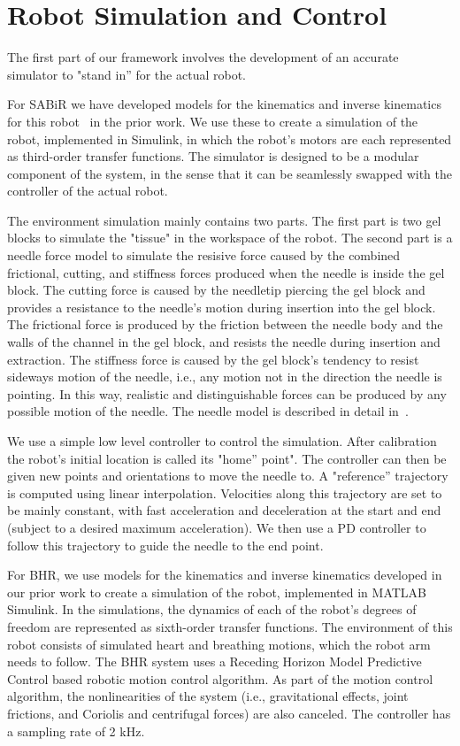 \section{Robot Simulation and Control}\label{robotsimulator}
The first part of our framework involves the development of an accurate simulator to "stand in'' for the actual robot. 

For SABiR we have developed models for the kinematics and inverse kinematics for this robot~\cite{hwang2009kinematic} in the prior work. We use these to create a simulation of the robot, implemented in Simulink, in which the robot’s motors are each represented as third-order transfer functions. The simulator is designed to be a modular component of the system, in the sense that it can be seamlessly swapped with the controller of the actual robot.

The environment simulation mainly contains two parts. The first part is two gel blocks to simulate the "tissue" in the workspace of the robot.  The second part is a needle force model to simulate the resisive force caused by the combined frictional, cutting, and stiffness forces produced when the needle is inside the gel block. The cutting force is caused by the needletip piercing the gel block and provides a resistance to the needle’s motion during insertion into the gel block.  The frictional force is produced by the friction between the needle body and the walls of the channel in the gel block, and resists the needle during insertion and extraction. The stiffness force is caused by the gel block’s tendency to resist sideways motion of the needle, i.e., any motion not in the direction the needle is pointing. In this way, realistic and distinguishable forces can be produced by any possible motion of the needle. The needle model is described in detail in~\cite{Russell2012}.

We use a simple low level controller to control the simulation. After calibration the robot’s initial location is called its "home'' point". The controller can then be given new points and orientations to move the needle to. A "reference'' trajectory is computed using linear interpolation. Velocities along this trajectory are set to be mainly constant, with fast acceleration and deceleration at the start and end (subject to a desired maximum acceleration). We then use a PD controller to follow this trajectory to guide the needle to the end point.

For BHR, we use models for the kinematics and inverse kinematics developed in our prior work \cite{bebek2007whisker} to create a simulation of the robot, implemented in MATLAB Simulink. In the simulations, the dynamics of each of the robot’s degrees of freedom are represented as sixth-order transfer functions. The environment of this robot consists of simulated heart and breathing motions, which the robot arm needs to follow. The BHR system uses a Receding Horizon Model Predictive Control based robotic motion control algorithm. As part of the motion control algorithm, the nonlinearities of the system (i.e., gravitational effects, joint frictions, and Coriolis and centrifugal forces) are also canceled. The controller has a sampling rate of 2 kHz.

